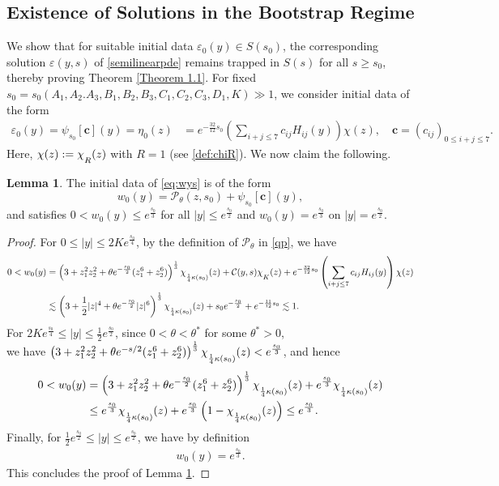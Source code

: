 \documentclass[11pt,reqno]{amsart}
\theoremstyle{definition}
\theoremstyle{bfremark}
\newtheorem{lemma}{Lemma}[section]
\numberwithin{equation}{section}
\newcommand{\mchi}{\raisebox{0pt}[1ex][1ex]{$\chi$}}
\begin{document}
 \subsection{Existence of Solutions in the Bootstrap Regime}
We show that for suitable initial data \(\varepsilon_0(y) \in S(s_0)\), the corresponding solution
\(\varepsilon(y,s)\) of \ref{semilinearpde} remains trapped in \(S(s)\) for all \( s \geq s_0\), thereby proving Theorem \ref{Theorem 1.1}. For fixed \(s_0=s_0(A_1, A_2.A_3, B_1, B_2, B_3, C_1, C_2, C_3, D_1,K) \gg 1\), we consider initial data of the form
\begin{align}
    \varepsilon_0(y)= \psi_{s_0}[\textbf{c}](y)=\eta_0(z)&=e^{-\frac{32}{12}s_0}\left(\sum_{i+j \leq 7}c_{ij}H_{ij}(y)\right)\chi(z), \quad \mathbf{c} = (c_{ij})_{0 \leq i+j \leq 7}.\label{initialdata}
\end{align}
Here, \(\chi(z):=\mchi_R(z)\) with \(R=1\) (see \ref{def:chiR}). We now claim the following.
\begin{lemma}
\label{lem:initial data bound} The initial data of \eqref{eq:wys} is of the form
\[
w_0(y) = \mathcal{P}_{\theta}(z, s_0) + \psi_{s_0}[\mathbf{c}](y),
\]
and satisfies \(0<w_0(y) \leq e^{\frac{s_0}{3}}\) for all \(|y| \leq e^{\frac{s_0}{2}}\) and \(w_0(y)=e^{\frac{s_0}{3}}\) on \(|y|=e^{\frac{s_0}{2}}\).
\end{lemma}

\begin{proof}
For \(0 \leq |y| \leq 2Ke^{\frac{s_0}{4}}\), by the definition of \(\mathcal{P}_{\theta}\) in \ref{qp}, we have
\begin{align*}
    0 <w_0(y)&=\left(3 + z_1^2 z_2^2 + \theta e^{-\frac{s_0}{2}}(z_1^6 + z_2^6) \right)^{\frac{1}{3}}\mchi_{\frac{1}{4}\kappa(s_0)}(z) + \mathcal{C}(y,s) \mchi_K(z)+e^{-\frac{32}{12}s_0}\left(\sum_{i+j \leq 7}c_{ij}H_{ij}(y)\right)\chi(z)\\
    & \lesssim \left(3 + \frac{1}{2}|z|^4 + \theta e^{-\frac{s_0}{2}}|z|^6\right)^{\frac{1}{3}}\mchi_{\frac{1}{4}\kappa(s_0)}(z)+s_0e^{-\frac{s_0}{2}}+e^{-\frac{11}{12}s_0} \lesssim 1.
\end{align*}
For \(2Ke^{\frac{s_0}{4}} \leq |y| \leq \frac{1}{2}e^{\frac{s_0}{2}}\), since \(0<\theta<\theta^*\) for some \(\theta^*>0\),\\
we have
\(\left(3 + z_1^2 z_2^2 + \theta e^{-s/2}(z_1^6 + z_2^6)\right)^{\frac{1}{3}}\mchi_{\frac{1}{4}\kappa(s_0)}(z)<e^{\frac{s_0}{3}}\), and hence
\begin{align*}
    0<w_0(y) &= \left(3 + z_1^2 z_2^2 + \theta e^{-\frac{s_0}{2}}(z_1^6 + z_2^6) \right)^{\frac{1}{3}}\mchi_{\frac{1}{4}\kappa(s_0)}(z) +e^{\frac{s_0}{3}}\mchi_{\frac{1}{4}\kappa(s_0)}(z)\\
    & \leq e^{\frac{s_0}{3}}\mchi_{\frac{1}{4}\kappa(s_0)}(z)+e^{\frac{s_0}{3}}\left(1-\mchi_{\frac{1}{4}\kappa(s_0)}(z)\right) \leq e^{\frac{s_0}{3}}.
\end{align*}
Finally, for \(\frac{1}{2}e^{\frac{s_0}{2}} \leq |y| \leq e^{\frac{s_0}{2}}\), we have by definition
\begin{align*}
    w_0(y)=e^{\frac{s_0}{3}}.
\end{align*}
This concludes the proof of Lemma \ref{lem:initial data bound}.
\end{proof}
\end{document}
